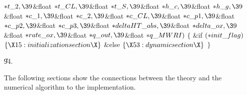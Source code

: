 \documentclass[letterpaper,12pt,baseclass=report]{cweb-hy}
\begin{document}
{${}{*}\\{t\_2},\39{}$\&{float} ${}{*}\\{t\_CL},\39{}$\&{float} ${}{*}\\{t\_S},%
\39{}$\&{float} ${}{*}\\{h\_c},\39{}$\&{float} ${}{*}\\{h\_g},\39{}$\&{float}
${}{*}\\{c\_1},\39{}$\&{float} ${}{*}\\{c\_2},\39{}$\&{float} ${}{*}\\{c\_CL},%
\39{}$\&{float} ${}{*}\\{c\_p1},\39{}$\&{float} ${}{*}\\{c\_p2},\39{}$\&{float}
${}{*}\\{c\_p3},\39{}$\&{float} ${}{*}\\{deltaHT\_abs},\39{}$\&{float} ${}{*}%
\\{delta\_ox},\39{}$\&{float} ${}{*}\\{rate\_ox},\39{}$\&{float} ${}{*}\\{q%
\_out},\39{}$\&{float} ${}{*}\\{q\_MWRI}){}$\1\1\2\2\6
${}\{{}$\1\6
\&{if} ${}({*}\\{init\_flag}){}$\5
${}\{\X15:initialization section\X\}{}$\6
\&{else}\5
${}\{\X53:dynamic section\X\}{}$\6
\4${}\}{}$\2\par
\U94.\fi

The following sections show the connections between the theory and the
numerical algorithm
to the implementation.
~\newpage
}
\end{document}
